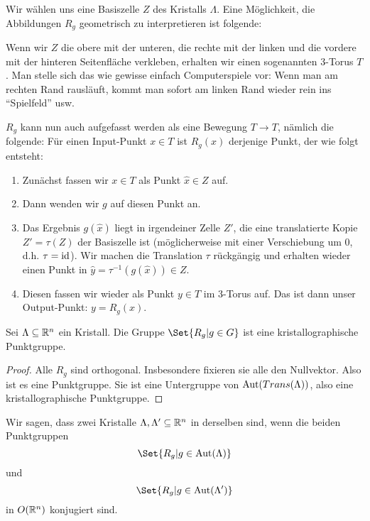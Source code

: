 \begin{remark}
Wir wählen uns eine Basiszelle $Z$ des Kristalls $\Lambda$. Eine Möglichkeit, die Abbildungen $R_g$ geometrisch zu interpretieren ist folgende:

Wenn wir $Z$ die obere mit der unteren, die rechte mit der linken und die vordere mit der hinteren Seitenfläche verkleben, erhalten wir einen sogenannten 3-Torus $T$. Man stelle sich das wie gewisse einfach Computerspiele vor: Wenn man am rechten Rand rausläuft, kommt man sofort am linken Rand wieder rein ins \enquote{Spielfeld} usw.

\medbreak
$R_g$ kann nun auch aufgefasst werden als eine Bewegung $T\to T$, nämlich die folgende: Für einen Input-Punkt $x\in T$ ist $R_g(x)$ derjenige Punkt, der wie folgt entsteht:
\begin{enumerate}
\item Zunächst fassen wir $x\in T$ als Punkt $\hat{x}\in Z$ auf.
\item Dann wenden wir $g$ auf diesen Punkt an.
\item Das Ergebnis $g(\hat{x})$ liegt in irgendeiner Zelle $Z'$, die eine translatierte Kopie $Z'=\tau(Z)$ der Basiszelle ist (möglicherweise mit einer Verschiebung um $0$, d.h. $\tau=\operatorname{id}$). Wir machen die Translation $\tau$ rückgängig und erhalten wieder einen Punkt in $\hat{y}=\tau^{-1}(g(\hat{x}))\in Z$.
\item Diesen fassen wir wieder als Punkt $y\in T$ im 3-Torus auf. Das ist dann unser Output-Punkt: $y=R_g(x)$.
\end{enumerate}
\end{remark}

\begin{corollary}
Sei $\Lambda\subseteq\mathbb{R}^n$ ein Kristall. Die Gruppe $\Set{R_g | g\in G}$ ist eine kristallographische Punktgruppe.
\end{corollary}
\begin{proof}
Alle $R_g$ sind orthogonal. Insbesondere fixieren sie alle den Nullvektor. Also ist es eine Punktgruppe. Sie ist eine Untergruppe von $\operatorname{Aut}(Trans(\Lambda))$, also eine kristallographische Punktgruppe. 
\end{proof}

\begin{definition}[Kristallklassen]
Wir sagen, dass zwei Kristalle $\Lambda,\Lambda'\subseteq\mathbb{R}^n$ in derselben  sind, wenn die beiden Punktgruppen
\[\Set{R_g | g\in\Aut(\Lambda)}\]
und
\[\Set{R_g | g\in\Aut(\Lambda')}\]
in $O(\mathbb{R}^n)$ konjugiert sind.
\end{definition}

